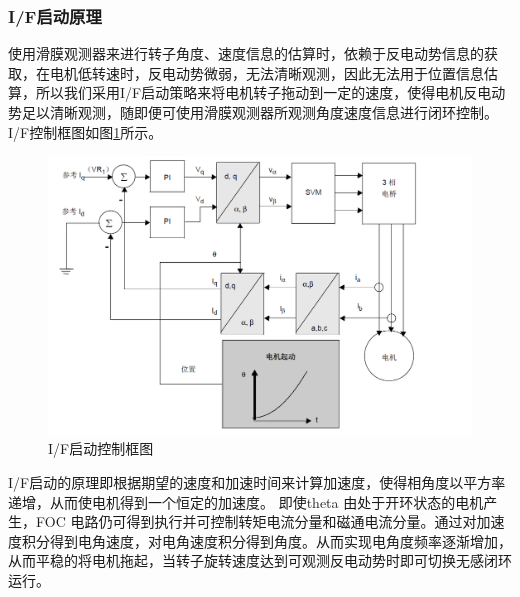 ﻿\documentclass[12pt,a4paper]{article}
\begin{document}
\subsubsection{I/F启动原理}
使用滑膜观测器来进行转子角度、速度信息的估算时，依赖于反电动势信息的获取，在电机低转速时，反电动势微弱，无法清晰观测，因此无法用于位置信息估算，所以我们采用I/F启动策略来将电机转子拖动到一定的速度，使得电机反电动势足以清晰观测，随即便可使用滑膜观测器所观测角度速度信息进行闭环控制。
I/F控制框图如图\ref{Con1}所示。
\begin{figure}
  \centering
  \includegraphics[width=\textwidth]{./picture/IF启动.png}
  \caption{I/F启动控制框图}
  \label{Con1}
\end{figure}

I/F启动的原理即根据期望的速度和加速时间来计算加速度，使得相角度以平方率递增，从而使电机得到一个恒定的加速度。 即使theta 由处于开环状态的电机产生，FOC 电路仍可得到执行并可控制转矩电流分量和磁通电流分量。通过对加速度积分得到电角速度，对电角速度积分得到角度。从而实现电角度频率逐渐增加，从而平稳的将电机拖起，当转子旋转速度达到可观测反电动势时即可切换无感闭环运行。
\end{document}
